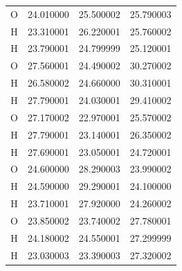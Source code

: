 \begin{table}
\begin{tabular}{ c c c c }
	O &  24.010000 &  25.500002 &  25.790003 \\
	H &  23.310001 &  26.220001 &  25.760002 \\
	H &  23.790001 &  24.799999 &  25.120001 \\
	O &  27.560001 &  24.490002 &  30.270002 \\
	H &  26.580002 &  24.660000 &  30.310001 \\
	H &  27.790001 &  24.030001 &  29.410002 \\
	O &  27.170002 &  22.970001 &  25.570002 \\
	H &  27.790001 &  23.140001 &  26.350002 \\
	H &  27.690001 &  23.050001 &  24.720001 \\
	O &  24.600000 &  28.290003 &  23.990002 \\
	H &  24.590000 &  29.290001 &  24.100000 \\
	H &  23.710001 &  27.920000 &  24.260002 \\
	O &  23.850002 &  23.740002 &  27.780001 \\
	H &  24.180002 &  24.550001 &  27.299999 \\
	H &  23.030003 &  23.390003 &  27.320002 \\
    \hline
    \hline
    \end{tabular}
\end{table}
\newpage
\renewcommand*{\arraystretch}{.6}
